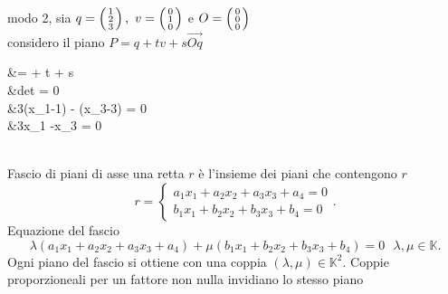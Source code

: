 \documentclass[12px]{article}
\begin{document}
	modo 2, sia $q = \left(\begin{smallmatrix}1\\2\\3\end{smallmatrix}\right), \ v = \left(\begin{smallmatrix}0\\1\\0\end{smallmatrix}\right)$ e $O = \left(\begin{smallmatrix}0\\0\\0\end{smallmatrix}\right)$\\ considero il piano $P = q + tv + s\overrightarrow{Oq}$ \\
	\begin{aligend}
		&= + t + s\\
		&det = 0 \\
		&3(x_1-1) - (x_3-3) = 0\\
		&3x_1 -x_3 = 0
	\end{aligend}\\
	Fascio di piani di asse una retta $r$ è l'insieme dei piani che contengono $r$
	\[
	r = \begin{cases}
		a_1x_1+a_2x_2+a_3x_3+a_4 = 0\\
		b_1x_1+b_2x_2+b_3x_3+b_4=0
	\end{cases}
	.\] 
	Equazione del fascio
	\[
	\lambda(a_1x_1+a_2x_2+a_3x_3+a_4) + \mu(b_1x_1+b_2x_2+b_3x_3+b_4) = 0 \ \ \ \lambda,\mu\in \mathbb{K}
	.\] 
	Ogni piano del fascio si ottiene con una coppia $(\lambda,\mu)\in \mathbb{K}^2.$ Coppie proporzioneali per un fattore non nulla invidiano lo stesso piano
\end{document}
